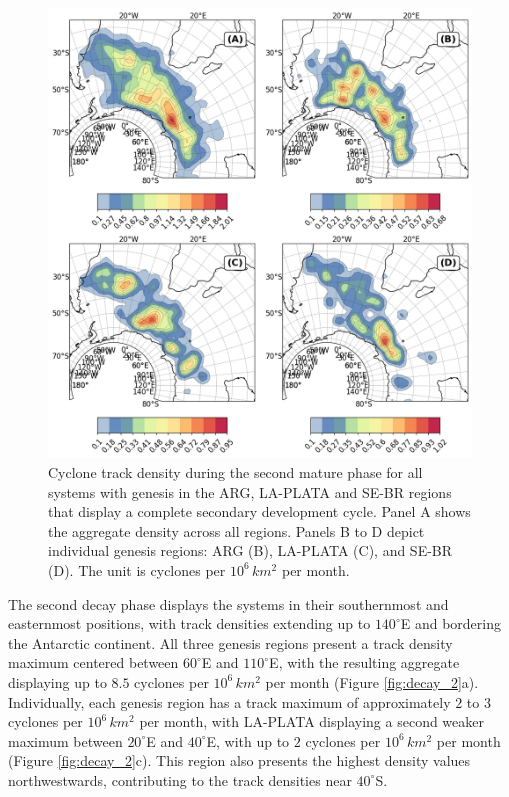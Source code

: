 \begin{figure}[!htbp]
\centering
\includegraphics[width=\textwidth]{figs_4/density_map_mature 2_regions_secondary.png}
\caption[Track Density - Mature 2]{Cyclone track density during the second mature phase for all systems with genesis in the ARG, LA-PLATA and SE-BR regions that display a complete secondary development cycle. Panel A shows the aggregate density across all regions. Panels B to D depict individual genesis regions: ARG (B), LA-PLATA (C), and SE-BR (D). The unit is cyclones per \(10^6 \, km^2\) per month.}
\label{fig:mature_2}
\end{figure}

The second decay phase displays the systems in their southernmost and easternmost positions, with track densities extending up to \(140^\circ\)E and bordering the Antarctic continent. All three genesis regions present a track density maximum centered between \(60^\circ\)E and \(110^\circ\)E, with the resulting aggregate displaying up to \(8.5\) cyclones per \(10^6 \, km^2\) per month (Figure \ref{fig:decay_2}a). Individually, each genesis region has a track maximum of approximately \(2\) to \(3\) cyclones per \(10^6 \, km^2\) per month, with LA-PLATA displaying a second weaker maximum between \(20^\circ\)E and \(40^\circ\)E, with up to \(2\) cyclones per \(10^6 \, km^2\) per month (Figure \ref{fig:decay_2}c). This region also presents the highest density values northwestwards, contributing to the track densities near \(40^\circ\)S.


